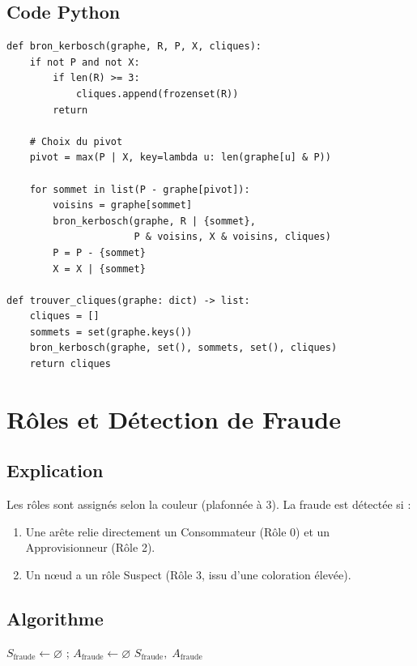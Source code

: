 \documentclass[12pt, a4paper]{article}
\begin{document}
\subsection{Code Python}
\begin{lstlisting}[style=python, caption={bron\_kerbosch(...) et trouver\_cliques(...)}]
def bron_kerbosch(graphe, R, P, X, cliques):
    if not P and not X:
        if len(R) >= 3:
            cliques.append(frozenset(R))
        return
    
    # Choix du pivot
    pivot = max(P | X, key=lambda u: len(graphe[u] & P))
    
    for sommet in list(P - graphe[pivot]):
        voisins = graphe[sommet]
        bron_kerbosch(graphe, R | {sommet}, 
                      P & voisins, X & voisins, cliques)
        P = P - {sommet}
        X = X | {sommet}

def trouver_cliques(graphe: dict) -> list:
    cliques = []
    sommets = set(graphe.keys())
    bron_kerbosch(graphe, set(), sommets, set(), cliques)
    return cliques
\end{lstlisting}

\section{Rôles et Détection de Fraude}
\subsection{Explication}
\begin{tcolorbox}[explication]
    Les rôles sont assignés selon la couleur (plafonnée à 3). La fraude est détectée si :
    \begin{enumerate}
        \item Une arête relie directement un Consommateur (Rôle 0) et un Approvisionneur (Rôle 2).
        \item Un nœud a un rôle Suspect (Rôle 3, issu d'une coloration élevée).
    \end{enumerate}
\end{tcolorbox}

\subsection{Algorithme}
\begin{algorithm}[H]
    \caption{Détection des circuits frauduleux}
    $S_{\text{fraude}} \leftarrow \varnothing$ ; $A_{\text{fraude}} \leftarrow \varnothing$\;
    \Retourner $S_{\text{fraude}},\; A_{\text{fraude}}$\;
\end{algorithm}
\end{document}
